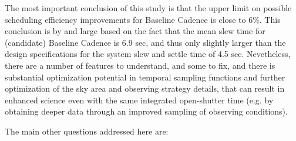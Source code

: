 The most important conclusion of this study is that the upper limit on possible
scheduling efficiency improvements for Baseline Cadence is close to 6\%. This
conclusion is by and large based on the fact that the mean slew time for (candidate)
Baseline Cadence is 6.9 sec, and thus only slightly larger than the design specifications
for the system slew and settle time of 4.5 sec.  Nevetheless, there are a number of
features to understand, and some to fix, and there is substantial optimization
potential in temporal sampling functions and further optimization of the sky area
and observing strategy details, that can result in enhanced science even with the
same integrated open-shutter time (e.g. by obtaining deeper data through an
improved sampling of observing conditions).

\vskip 0.2in
The main other questions addressed here are:

